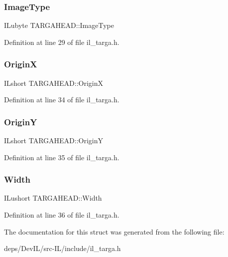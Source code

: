 \subsubsection{\texorpdfstring{Image\+Type}{ImageType}}
{\footnotesize\ttfamily I\+Lubyte T\+A\+R\+G\+A\+H\+E\+A\+D\+::\+Image\+Type}



Definition at line 29 of file il\+\_\+targa.\+h.

\mbox{\label{structTARGAHEAD_a6fb4430e795c9dbf31547ad47e6334f6}} 
\subsubsection{\texorpdfstring{OriginX}{OriginX}}
{\footnotesize\ttfamily I\+Lshort T\+A\+R\+G\+A\+H\+E\+A\+D\+::\+OriginX}



Definition at line 34 of file il\+\_\+targa.\+h.

\mbox{\label{structTARGAHEAD_a89179f8bada6f43e43a1bc34b9cae410}} 
\subsubsection{\texorpdfstring{OriginY}{OriginY}}
{\footnotesize\ttfamily I\+Lshort T\+A\+R\+G\+A\+H\+E\+A\+D\+::\+OriginY}



Definition at line 35 of file il\+\_\+targa.\+h.

\mbox{\label{structTARGAHEAD_a40dbcd9ad3a763d6e508040c39ca88ea}} 
\subsubsection{\texorpdfstring{Width}{Width}}
{\footnotesize\ttfamily I\+Lushort T\+A\+R\+G\+A\+H\+E\+A\+D\+::\+Width}



Definition at line 36 of file il\+\_\+targa.\+h.



The documentation for this struct was generated from the following file\+:\begin{DoxyCompactItemize}
\item 
deps/\+Dev\+I\+L/src-\/\+I\+L/include/il\+\_\+targa.\+h\end{DoxyCompactItemize}
